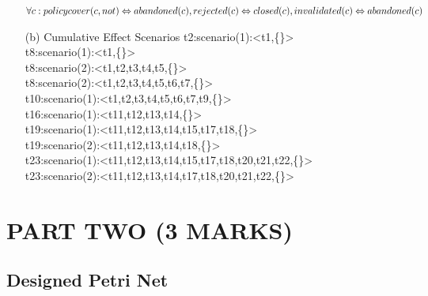 \documentclass[runningheads]{llncs}
\begin{document}
\begin{itemize}
          $\forall c: policycover(c, not) \Leftrightarrow abandoned(c), \\ rejected(c) \Leftrightarrow closed(c), \\ invalidated(c) \Leftrightarrow abandoned(c) $
          \\



    \item[(b)]{Cumulative Effect Scenarios}
          t2:scenario(1):<t1,\{<t2>\}>\\
          t8:scenario(1):<t1,\{<t8>\}>\\
          t8:scenario(2):<t1,t2,t3,t4,t5,\{<t8>\}> \\
          t8:scenario(2):<t1,t2,t3,t4,t5,t6,t7,\{<t8>\}> \\
          t10:scenario(1):<t1,t2,t3,t4,t5,t6,t7,t9,\{<t10>\}>\\
          t16:scenario(1):<t11,t12,t13,t14,\{<t16>\}>    \\
          t19:scenario(1):<t11,t12,t13,t14,t15,t17,t18,\{<t19>\}>\\
          t19:scenario(2):<t11,t12,t13,t14,t18,\{<t19>\}> \\
          t23:scenario(1):<t11,t12,t13,t14,t15,t17,t18,t20,{t21,t22},\{<t23>\}>\\
          t23:scenario(2):<t11,t12,t13,t14,t17,t18,t20,{t21,t22},\{<t23>\}>\\

\end{itemize}

\section{PART TWO (3 MARKS)}
\subsection{Designed Petri Net}
\end{document}
